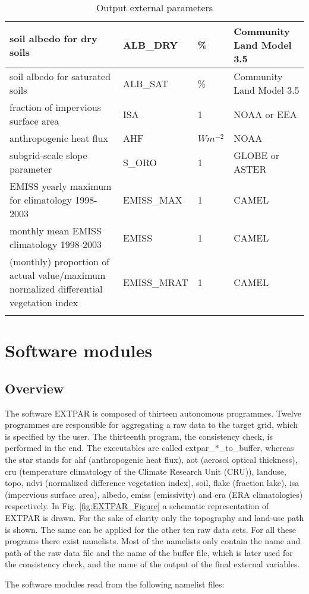 \documentclass[a4paper,10pt,DIV14,BCOR1cm,titlepage,twoside]{scrartcl}
\providecommand{\tabularnewline}{\\}
\begin{document}
\begin{longtable}{|p{6.5cm}|p{3cm}|p{1.6cm}|p{3.5cm}|}
soil albedo for dry soils &ALB\_\-DRY &\% & Community Land Model 3.5
\tabularnewline\hline
soil albedo for saturated soils &ALB\_\-SAT &\% & Community Land Model 3.5
\tabularnewline\hline
fraction of impervious surface area &ISA &1 & NOAA or EEA
\tabularnewline\hline
anthropogenic heat flux &AHF &$W m^{-2}$ & NOAA
\tabularnewline\hline
subgrid-scale slope parameter &S\_ORO &1 & GLOBE or ASTER
\tabularnewline\hline
EMISS yearly maximum for climatology 1998-2003 &EMISS\_MAX &1 & CAMEL
\tabularnewline\hline
monthly mean EMISS climatology 1998-2003 &EMISS &1 & CAMEL
\tabularnewline\hline
(monthly) proportion of actual value/maximum normalized differential vegetation index &EMISS\_MRAT &1 & CAMEL
\tabularnewline\hline
\bottomrule
\caption{Output external parameters}
\label{extpar_output}
\end{longtable}


\section{Software modules}\label{Software_modules}
\subsection{Overview}\label{Overview}
The software EXTPAR is composed of thirteen autonomous programmes. Twelve programmes are responsible for aggregating a raw data to the target grid, which is specified by the user. The thirteenth program, the consistency check, is performed in the end. The executables are called extpar\_$\ast$\_to\_buffer, whereas the star stands for ahf (anthropogenic heat flux), aot (aerosol optical thickness), cru (temperature climatology of the Climate Research Unit (CRU)), landuse, topo, ndvi (normalized difference vegetation index), soil, flake (fraction lake), isa (impervious surface area), albedo, emiss (emissivity) and era (ERA climatologies) respectively. In Fig. \ref{fig:EXTPAR_Figure} a schematic representation of EXTPAR is drawn. For the sake of clarity only the topography and land-use path is shown. The same can be applied for the other ten raw data sets. For all these programs there exist namelists. Most of the namelists only contain the name and path of the raw data file and the name of the buffer file, which is later used for the consistency check, and the name of the output of the final external variables. \par\medskip\noindent

The software modules read from the following namelist files:
\end{document}
